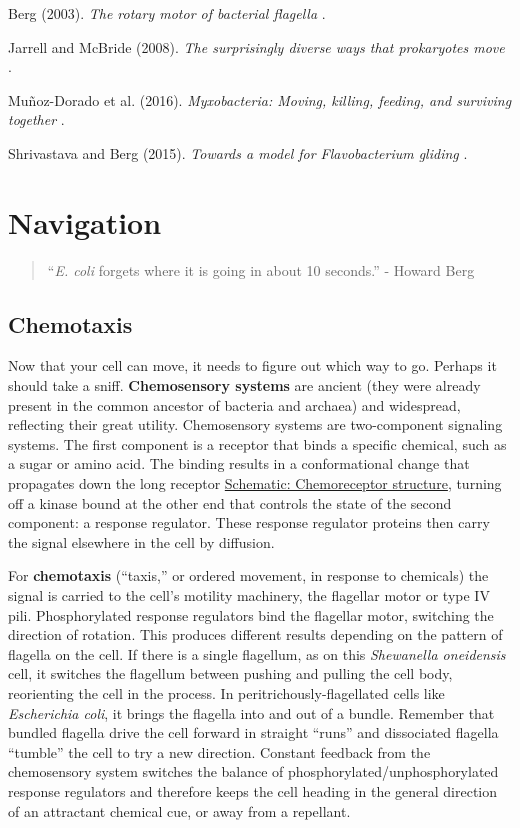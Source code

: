 \documentclass[]{tufte-book}
\begin{document}
Berg (2003). \emph{The rotary motor of bacterial flagella} \citep{berg2003}.

Jarrell and McBride (2008). \emph{The surprisingly diverse ways that prokaryotes move} \citep{jarrell2008}.

Muñoz-Dorado et al. (2016). \emph{Myxobacteria: Moving, killing, feeding, and surviving together} \citep{munoz-dorado2016}.

Shrivastava and Berg (2015). \emph{Towards a model for Flavobacterium gliding} \citep{shrivastava2015}.

\hypertarget{navigation}{%
\chapter{Navigation}\label{navigation}}

\begin{quote}
``\emph{E. coli} forgets where it is going in about 10 seconds.''
- Howard Berg \citep{berg1988}
\end{quote}

\hypertarget{chemotaxis}{%
\section{Chemotaxis}\label{chemotaxis}}

Now that your cell can move, it needs to figure out which way to go. Perhaps it should take a sniff. \textbf{Chemosensory systems} are ancient (they were already present in the common ancestor of bacteria and archaea) and widespread, reflecting their great utility. Chemosensory systems are two-component signaling systems. The first component is a receptor that binds a specific chemical, such as a sugar or amino acid. The binding results in a conformational change that propagates down the long receptor \protect\hyperlink{Chemoreceptor_structure}{Schematic: Chemoreceptor structure}, turning off a kinase bound at the other end that controls the state of the second component: a response regulator. These response regulator proteins then carry the signal elsewhere in the cell by diffusion.

For \textbf{chemotaxis} (``taxis,'' or ordered movement, in response to chemicals) the signal is carried to the cell's motility machinery, the flagellar motor or type IV pili. Phosphorylated response regulators bind the flagellar motor, switching the direction of rotation. This produces different results depending on the pattern of flagella on the cell. If there is a single flagellum, as on this \emph{Shewanella oneidensis} cell, it switches the flagellum between pushing and pulling the cell body, reorienting the cell in the process. In peritrichously-flagellated cells like \emph{Escherichia coli}, it brings the flagella into and out of a bundle. Remember that bundled flagella drive the cell forward in straight ``runs'' and dissociated flagella ``tumble'' the cell to try a new direction. Constant feedback from the chemosensory system switches the balance of phosphorylated/unphosphorylated response regulators and therefore keeps the cell heading in the general direction of an attractant chemical cue, or away from a repellant.
\end{document}
